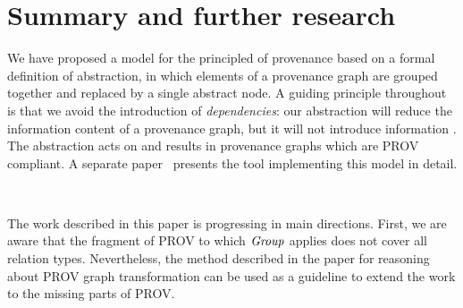 
\section{Summary and further research}
\label{sec:further}

We have proposed a model for the principled  of provenance based on a formal definition of abstraction, in which elements of a provenance graph are grouped together and replaced by a single abstract node.  
A guiding principle  throughout is that we avoid the introduction of \emph{ dependencies}: our abstraction will reduce the information content of a provenance graph, but it will not introduce information .  
The abstraction acts on and results in provenance graphs which are PROV compliant.   A separate paper~\citep{Missier2014} presents the tool implementing this model in detail.


~ 


The work described in this paper is progressing in  main directions.
%
First, we are aware that the fragment of PROV to which $\mathit{Group}$ applies does not cover all relation types. Nevertheless, the method described in the paper for reasoning about PROV graph transformation can be used as a guideline to extend the work to the missing parts of PROV.

